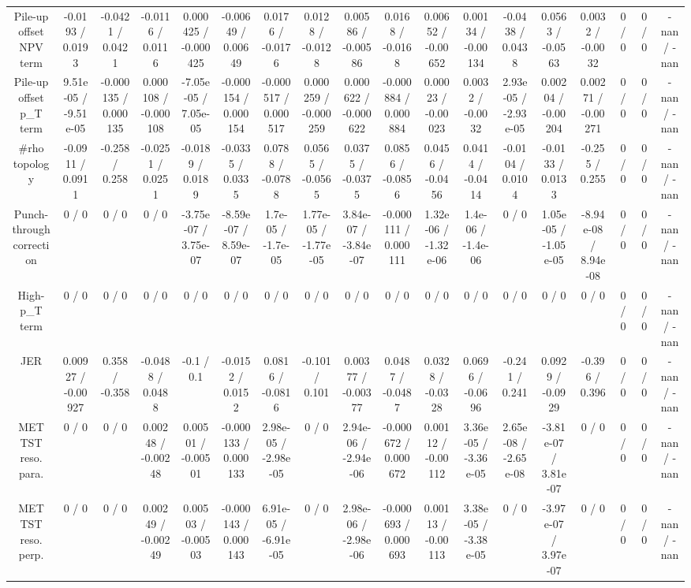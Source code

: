 \documentclass[10pt]{article}
\begin{document}
\begin{table}[htbp]
\begin{center}
\begin{tabular}{|c|c|c|c|c|c|c|c|c|c|c|c|c|c|c|c|c|c|}
  Pile-up offset NPV term & -0.0193 / 0.0193 & -0.0421 / 0.0421 & -0.0116 / 0.0116 & 0.000425 / -0.000425 & -0.00649 / 0.00649 & 0.0176 / -0.0176 & 0.0128 / -0.0128 & 0.00586 / -0.00586 & 0.0168 / -0.0168 & 0.00652 / -0.00652 & 0.00134 / -0.00134 & -0.0438 / 0.0438 & 0.0563 / -0.0563 & 0.0032 / -0.0032 & 0 / 0 & 0 / 0 & -nan / -nan \\ 
  Pile-up offset p_{T} term & 9.51e-05 / -9.51e-05 & -0.000135 / 0.000135 & 0.000108 / -0.000108 & -7.05e-05 / 7.05e-05 & -0.000154 / 0.000154 & -0.000517 / 0.000517 & 0.000259 / -0.000259 & 0.000622 / -0.000622 & -0.000884 / 0.000884 & 0.00023 / -0.00023 & 0.0032 / -0.0032 & 2.93e-05 / -2.93e-05 & 0.00204 / -0.00204 & 0.00271 / -0.00271 & 0 / 0 & 0 / 0 & -nan / -nan \\ 
  #rho topology & -0.0911 / 0.0911 & -0.258 / 0.258 & -0.0251 / 0.0251 & -0.0189 / 0.0189 & -0.0335 / 0.0335 & 0.0788 / -0.0788 & 0.0565 / -0.0565 & 0.0375 / -0.0375 & 0.0856 / -0.0856 & 0.0456 / -0.0456 & 0.0414 / -0.0414 & -0.0104 / 0.0104 & -0.0133 / 0.0133 & -0.255 / 0.255 & 0 / 0 & 0 / 0 & -nan / -nan \\ 
  Punch-through correction & 0 / 0 & 0 / 0 & 0 / 0 & -3.75e-07 / 3.75e-07 & -8.59e-07 / 8.59e-07 & 1.7e-05 / -1.7e-05 & 1.77e-05 / -1.77e-05 & 3.84e-07 / -3.84e-07 & -0.000111 / 0.000111 & 1.32e-06 / -1.32e-06 & 1.4e-06 / -1.4e-06 & 0 / 0 & 1.05e-05 / -1.05e-05 & -8.94e-08 / 8.94e-08 & 0 / 0 & 0 / 0 & -nan / -nan \\ 
  High-p_{T} term & 0 / 0 & 0 / 0 & 0 / 0 & 0 / 0 & 0 / 0 & 0 / 0 & 0 / 0 & 0 / 0 & 0 / 0 & 0 / 0 & 0 / 0 & 0 / 0 & 0 / 0 & 0 / 0 & 0 / 0 & 0 / 0 & -nan / -nan \\ 
  JER & 0.00927 / -0.00927 & 0.358 / -0.358 & -0.0488 / 0.0488 & -0.1 / 0.1 & -0.0152 / 0.0152 & 0.0816 / -0.0816 & -0.101 / 0.101 & 0.00377 / -0.00377 & 0.0487 / -0.0487 & 0.0328 / -0.0328 & 0.0696 / -0.0696 & -0.241 / 0.241 & 0.0929 / -0.0929 & -0.396 / 0.396 & 0 / 0 & 0 / 0 & -nan / -nan \\ 
  MET TST reso. para. & 0 / 0 & 0 / 0 & 0.00248 / -0.00248 & 0.00501 / -0.00501 & -0.000133 / 0.000133 & 2.98e-05 / -2.98e-05 & 0 / 0 & 2.94e-06 / -2.94e-06 & -0.000672 / 0.000672 & 0.00112 / -0.00112 & 3.36e-05 / -3.36e-05 & 2.65e-08 / -2.65e-08 & -3.81e-07 / 3.81e-07 & 0 / 0 & 0 / 0 & 0 / 0 & -nan / -nan \\ 
  MET TST reso. perp. & 0 / 0 & 0 / 0 & 0.00249 / -0.00249 & 0.00503 / -0.00503 & -0.000143 / 0.000143 & 6.91e-05 / -6.91e-05 & 0 / 0 & 2.98e-06 / -2.98e-06 & -0.000693 / 0.000693 & 0.00113 / -0.00113 & 3.38e-05 / -3.38e-05 & 0 / 0 & -3.97e-07 / 3.97e-07 & 0 / 0 & 0 / 0 & 0 / 0 & -nan / -nan \\ 

\end{tabular}
\end{center}
\end{table}
\end{document}
